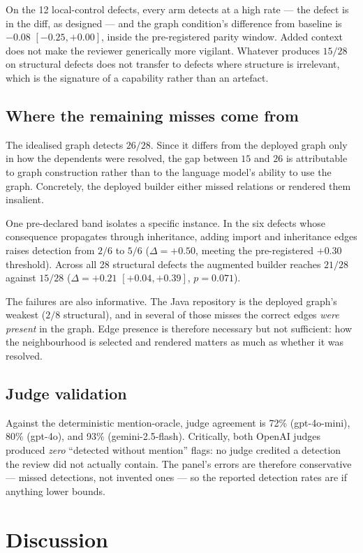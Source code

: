 \documentclass[conference]{IEEEtran}
\begin{document}
On the 12 local-control defects, every arm detects at a high rate --- the
defect is in the diff, as designed --- and the graph condition's difference
from baseline is $-0.08$ $[-0.25, +0.00]$, inside the pre-registered parity
window. Added context does not make the reviewer generically more vigilant.
Whatever produces $15/28$ on structural defects does not transfer to defects
where structure is irrelevant, which is the signature of a capability rather
than an artefact.

\subsection{Where the remaining misses come from}
The idealised graph detects $26/28$. Since it differs from the deployed
graph only in how the dependents were resolved, the gap between $15$ and
$26$ is attributable to graph construction rather than to the language
model's ability to use the graph. Concretely, the deployed builder either
missed relations or rendered them insalient.

One pre-declared band isolates a specific instance. In the six defects whose
consequence propagates through inheritance, adding import and inheritance
edges raises detection from $2/6$ to $5/6$ ($\Delta = +0.50$, meeting the
pre-registered $+0.30$ threshold). Across all 28 structural defects the
augmented builder reaches $21/28$ against $15/28$
($\Delta = +0.21$ $[+0.04, +0.39]$, $p = 0.071$).

The failures are also informative. The Java repository is the deployed
graph's weakest ($2/8$ structural), and in several of those misses the
correct edges \emph{were present} in the graph. Edge presence is therefore
necessary but not sufficient: how the neighbourhood is selected and rendered
matters as much as whether it was resolved.

\subsection{Judge validation}
Against the deterministic mention-oracle, judge agreement is 72\%
(gpt-4o-mini), 80\% (gpt-4o), and 93\% (gemini-2.5-flash). Critically, both
OpenAI judges produced \emph{zero} ``detected without mention'' flags: no
judge credited a detection the review did not actually contain. The panel's
errors are therefore conservative --- missed detections, not invented ones ---
so the reported detection rates are if anything lower bounds.

\section{Discussion}
\label{sec:discussion}
\end{document}
